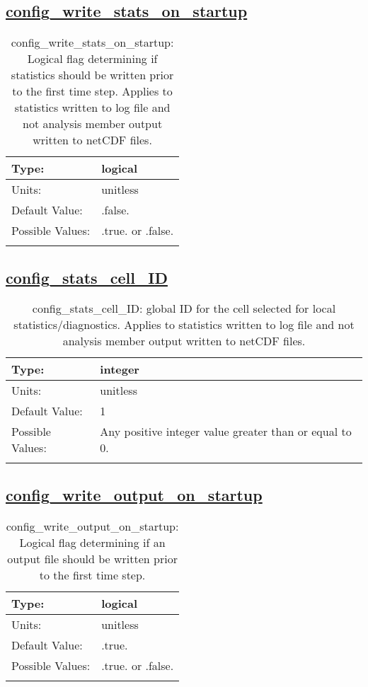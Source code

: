 \subsection[config\_write\_stats\_on\_startup]{\hyperref[sec:nm_tab_io]{config\_write\_stats\_on\_startup}}
\label{subsec:nm_sec_config_write_stats_on_startup}
\begin{center}
\begin{longtable}{| p{2.0in} || p{4.0in} |}
    \hline
    Type: & logical \\
    \hline
    Units: & \si{unitless} \\
    \hline
    Default Value: & .false. \\
    \hline
    Possible Values: & .true. or .false. \\
    \hline
    \caption{config\_write\_stats\_on\_startup: Logical flag determining if statistics should be written prior to the first time step. Applies to statistics written to log file and not analysis member output written to netCDF files.}
\end{longtable}
\end{center}
\subsection[config\_stats\_cell\_ID]{\hyperref[sec:nm_tab_io]{config\_stats\_cell\_ID}}
\label{subsec:nm_sec_config_stats_cell_ID}
\begin{center}
\begin{longtable}{| p{2.0in} || p{4.0in} |}
    \hline
    Type: & integer \\
    \hline
    Units: & \si{unitless} \\
    \hline
    Default Value: & 1 \\
    \hline
    Possible Values: & Any positive integer value greater than or equal to 0. \\
    \hline
    \caption{config\_stats\_cell\_ID: global ID for the cell selected for local statistics/diagnostics. Applies to statistics written to log file and not analysis member output written to netCDF files.}
\end{longtable}
\end{center}
\subsection[config\_write\_output\_on\_startup]{\hyperref[sec:nm_tab_io]{config\_write\_output\_on\_startup}}
\label{subsec:nm_sec_config_write_output_on_startup}
\begin{center}
\begin{longtable}{| p{2.0in} || p{4.0in} |}
    \hline
    Type: & logical \\
    \hline
    Units: & \si{unitless} \\
    \hline
    Default Value: & .true. \\
    \hline
    Possible Values: & .true. or .false. \\
    \hline
    \caption{config\_write\_output\_on\_startup: Logical flag determining if an output file should be written prior to the first time step.}
\end{longtable}
\end{center}
